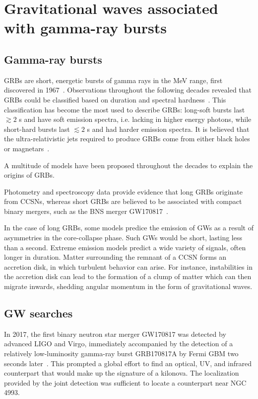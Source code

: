 \chapter{Gravitational waves associated with gamma-ray bursts}\label{ch:grb}

\section{Gamma-ray bursts}\label{sec:grb-astro}

\Acp{GRB} are short, energetic bursts of gamma rays in the MeV range, first discovered in 1967~\citep{Klebesadel_1973}.
Observations throughout the following decades revealed that \acp{GRB} could be classified based on duration and spectral hardness~\citep{Kouveliotou_1993}.
This classification has become the most used to describe \acp{GRB}: long-soft bursts last $\gtrsim2$ s and have soft emission spectra, i.e. lacking in higher energy photons, while short-hard bursts last $\lesssim2$ s and had harder emission spectra.
It is believed that the ultra-relativistic jets required to produce \acp{GRB} come from either black holes~\citep{Woosley_1993} or magnetars~\citep{Dai_1998}.

A multitude of models have been proposed throughout the decades to explain the origins of \acp{GRB}.

Photometry and spectroscopy data provide evidence that long \acp{GRB} originate from \acp{CCSN}, whereas short \acp{GRB} are believed to be associated with compact binary mergers, such as the \ac{BNS} merger GW170817~\citep{gw170817_grb}.

In the case of long \acp{GRB}, some models predice the emission of \acp{GW} as a result of asymmetries in the core-collapse phase.
Such \acp{GW} would be short, lasting less than a second.
Extreme emission models predict a wide variety of signals, often longer in duration.
Matter surrounding the remnant of a \ac{CCSN} forms an accretion disk, in which turbulent behavior can arise.
For instance, instabilities in the accretion disk can lead to the formation of a clump of matter which can then migrate inwards, shedding angular momentum in the form of gravitational waves.

\section{GW searches}\label{sec:grb-searches}

In 2017, the first binary neutron star merger GW170817 was detected by advanced LIGO and Virgo, immediately accompanied by the detection of a relatively low-luminosity gamma-ray burst GRB170817A by Fermi \ac{GBM} two seconds later~\citep{gw170817}.
This prompted a global effort to find an optical, UV, and infrared counterpart that would make up the signature of a kilonova.
The localization provided by the joint detection was sufficient to locate a counterpart near NGC 4993.

